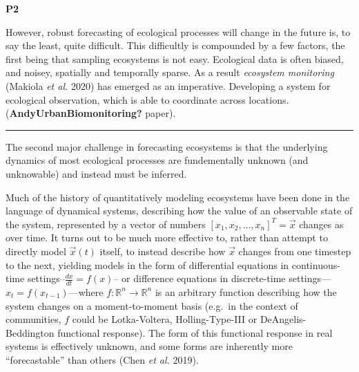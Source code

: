 \documentclass[10pt,oneside]{article}
\begin{document}
\textbf{P2}

However, robust forecasting of ecological processes will change in the
future is, to say the least, quite difficult. This difficultly is
compounded by a few factors, the first being that sampling ecosystems is
not easy. Ecological data is often biased, and noisey, spatially and
temporally sparse. As a result \emph{ecosystem monitoring} (Makiola
\emph{et al.} 2020) has emerged as an imperative. Developing a system
for ecological observation, which is able to coordinate across
locations. (\textbf{AndyUrbanBiomonitoring?} paper).

\begin{center}\rule{0.5\linewidth}{0.5pt}\end{center}

The second major challenge in forecasting ecosystems is that the
underlying dynamics of most ecological processes are fundementally
unknown (and unknowable) and instead must be inferred.

Much of the history of quantitatively modeling ecosystems have been done
in the language of dynamical systems, describing how the value of an
observable state of the system, represented by a vector of numbers
\([x_1, x_2, \dots, x_n]^T = \vec{x}\) changes as over time. It turns
out to be much more effective to, rather than attempt to directly model
\(\vec{x}(t)\) itself, to instead describe how \(\vec{x}\) changes from
one timestep to the next, yielding models in the form of differential
equations in continuous-time settings--\(\frac{dx}{dt} = f(x)\)-- or
difference equations in discrete-time
settings---\(x_t = f(x_{t-1})\)---where
\(f:\mathbb{R}^n \to \mathbb{R}^n\) is an arbitrary function describing
how the system changes on a moment-to-moment basis (e.g.~in the context
of communities, \(f\) could be Lotka-Voltera, Holling-Type-III or
DeAngelis-Beddington functional response). The form of this functional
response in real systems is effectively unknown, and some forms are
inherently more ``forecastable'' than others (Chen \emph{et al.} 2019).
\end{document}
